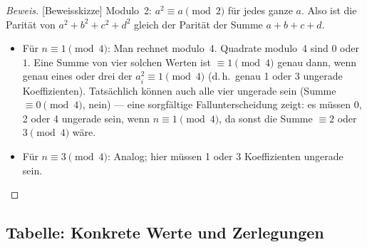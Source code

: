 \documentclass[12pt,a4paper]{article}
\newenvironment{beweis}{\begin{proof}[Beweis]}{\end{proof}}
\begin{document}
\begin{beweis}[Beweisskizze]
Modulo~2: $a^2 \equiv a \pmod{2}$ für jedes ganze $a$. Also ist die Parität von
$a^2+b^2+c^2+d^2$ gleich der Parität der Summe $a+b+c+d$.
\begin{itemize}[noitemsep]
  \item Für $n \equiv 1 \pmod{4}$: Man rechnet modulo~4. Quadrate modulo~4 sind
        $0$ oder $1$. Eine Summe von vier solchen Werten ist $\equiv 1 \pmod{4}$
        genau dann, wenn genau eines oder drei der $a_i^2 \equiv 1 \pmod{4}$
        (d.\,h.\ genau 1 oder 3 ungerade Koeffizienten). Tatsächlich können auch
        alle vier ungerade sein (Summe $\equiv 0 \pmod{4}$, nein) --- eine sorgfältige
        Fallunterscheidung zeigt: es müssen 0, 2 oder 4 ungerade sein, wenn
        $n \equiv 1 \pmod{4}$, da sonst die Summe $\equiv 2$ oder $3 \pmod{4}$ wäre.
  \item Für $n \equiv 3 \pmod{4}$: Analog; hier müssen 1 oder 3 Koeffizienten ungerade sein.
\end{itemize}
\end{beweis}

\subsection{Tabelle: Konkrete Werte und Zerlegungen}
\end{document}
